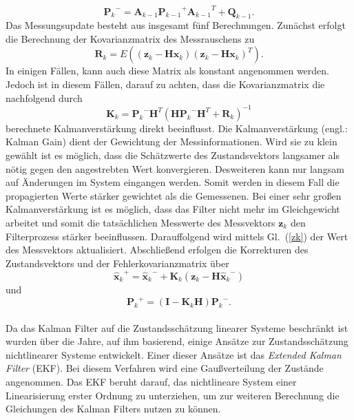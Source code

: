 \begin{equation}\label{Pk-}
  {\mathbf{P}_{k}}^- = \mathbf{A}_{k-1}{\mathbf{P}_{k-1}}^+{\mathbf{A}_{k-1}}^T + \mathbf{Q}_{k-1} .
\end{equation}
Das Messungsupdate besteht aus insgesamt fünf Berechnungen. Zunächst erfolgt die Berechnung der Kovarianzmatrix des Messrauschens zu
\begin{equation}\label{Rk}
  \mathbf{R}_{k} = E((\mathbf{z}_{k} - \mathbf{Hx}_k)(\mathbf{z}_{k} - \mathbf{Hx}_k)^T).
\end{equation}
In einigen Fällen, kann auch diese Matrix als konstant angenommen werden. Jedoch ist in diesem Fällen, darauf zu achten, dass die Kovarianzmatrix die nachfolgend durch
\begin{equation}\label{K}
  \mathbf{K}_k = {\mathbf{P}_k}^- \mathbf{H}^T(\mathbf{H}{\mathbf{P}_k}^-\mathbf{H}^T + \mathbf{R}_k)^{-1}
\end{equation}
berechnete Kalmanverstärkung direkt beeinflusst. \cite{P32}
Die Kalmanverstärkung (engl.: Kalman Gain) dient der Gewichtung der Messinformationen. Wird sie zu klein gewählt ist es möglich, dass die Schätzwerte des Zustandsvektors langsamer als nötig gegen den angestrebten Wert konvergieren. Desweiteren kann nur langsam auf Änderungen im System eingangen werden. Somit werden in diesem Fall die propagierten Werte stärker gewichtet als die Gemessenen.  Bei einer sehr großen Kalmanverstärkung ist es möglich, dass das Filter nicht mehr im Gleichgewicht arbeitet und somit die tatsächlichen Messwerte des Messvektors $\mathbf{z}_k$ den Filterprozess stärker beeinflussen. \cite{P24}
Darauffolgend wird mittels Gl.~(\ref{zk}) der Wert des Messvektors aktualisiert.
Abschließend erfolgen die Korrekturen des Zustandsvektors und der Fehlerkovarianzmatrix über
\begin{equation}\label{xk+}
  {\mathbf{\hat x}_k}^+ = {\mathbf{\hat x}_k}^- + \mathbf{K}_k(\mathbf{z}_k - {\mathbf{H\hat x}_k}^-)
\end{equation}
und
\begin{equation}\label{Pk+}
  {\mathbf{P}_k}^+ = (\mathbf{I} - \mathbf{K}_k\mathbf{H}){\mathbf{P}_k}^-.
\end{equation}
\cite{P32}
\\Da das Kalman Filter auf die Zustandsschätzung linearer Systeme beschränkt ist wurden über die Jahre, auf ihm basierend, einige Ansätze zur Zustandsschätzung nichtlinearer Systeme entwickelt.
Einer dieser Ansätze ist das \textit{Extended Kalman Filter} (EKF). Bei diesem Verfahren wird eine Gaußverteilung der Zustände angenommen. Das EKF beruht darauf, das nichtlineare System einer Linearisierung erster Ordnung zu unterziehen, um zur weiteren Berechnung die Gleichungen des Kalman Filters nutzen zu können.
